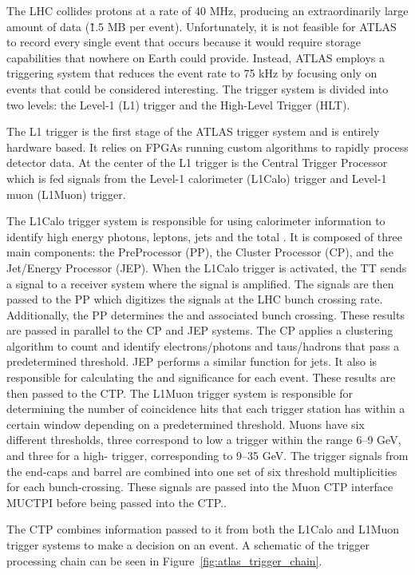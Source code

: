 The LHC collides protons at a rate of 40 MHz, producing an extraordinarily large amount of data (\~ 1.5 MB per event). Unfortunately, it is not feasible for ATLAS to record every single event that occurs because it would require storage capabilities that nowhere on Earth could provide. Instead, ATLAS employs a triggering system that reduces the event rate to 75 kHz by focusing only on events that could be considered interesting\@. The trigger system is divided into two levels: the Level-1 (L1) trigger and the High-Level Trigger (HLT)\@.

The L1 trigger is the first stage of the ATLAS trigger system and is entirely hardware based. It relies on FPGAs running custom algorithms to rapidly process detector data. At the center of the L1 trigger is the Central Trigger Processor which is fed signals from the Level-1 calorimeter (L1Calo) trigger and Level-1 muon (L1Muon) trigger.

The L1Calo trigger system is responsible for using calorimeter information to identify high energy photons, leptons, jets and the total \met{}. It is composed of three main components: the PreProcessor (PP), the Cluster Processor (CP), and the Jet/Energy Processor (JEP)\@. When the L1Calo trigger is activated, the TT sends a signal to a receiver system where the signal is amplified. The signals are then passed to the PP which digitizes the signals at the LHC bunch crossing rate. Additionally, the PP determines the \met{} and associated bunch crossing. These results are passed in parallel to the CP and JEP systems. The CP applies a clustering algorithm to count and identify electrons/photons and taus/hadrons that pass a predetermined threshold. JEP performs a similar function for jets. It also is responsible for calculating the \met{} and \met{} significance for each event. These results are then passed to the CTP\@. The L1Muon trigger system is responsible for determining the number of coincidence hits that each trigger station has within a certain window depending on a predetermined \pt{} threshold. Muons have six different thresholds, three correspond to low a \pt{} trigger within the range 6--9 GeV, and three for a high-\pt{} trigger, corresponding to 9--35 GeV. The trigger signals from the end-caps and barrel are combined into one set of six threshold multiplicities for each bunch-crossing. These signals are passed into the Muon CTP interface MUCTPI before being passed into the CTP.\@.

The CTP combines information passed to it from both the L1Calo and L1Muon trigger systems to make a decision on an event. A schematic of the trigger processing chain can be seen in Figure~\ref{fig:atlas_trigger_chain}.

